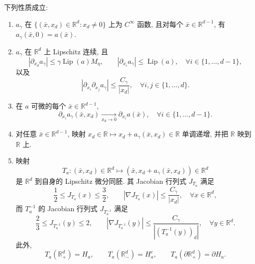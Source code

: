 \begin{Proposition}
\label{prop:chap3-regularized-graph-properties}
下列性质成立:
\begin{enumerate}
 \item $a_\gamma$ 在 $\{(\bar x,x_d)\in\mathbb R^d:x_d\neq0\}$ 上为 $C^\infty$ 函数, 且对每个 $\bar x\in\mathbb R^{d-1}$, 有 $a_\gamma(\bar x,0)=a(\bar x)$.
 \item $a_\gamma$ 在 $\mathbb R^d$ 上 Lipschitz 连续, 且
 \[
  |\partial_{x_d}a_\gamma|\leq\gamma\operatorname{Lip}(a)M_\eta,
  \qquad |\partial_{x_i}a_\gamma|\leq\operatorname{Lip}(a),
  \quad\forall i\in\{1,\ldots,d-1\},
 \]
 以及
 \[
  |\partial_{x_i}\partial_{x_j}a_\gamma|
  \leq\frac{C_\gamma}{|x_d|},
  \quad\forall i,j\in\{1,\ldots,d\}.
 \]
 \item 在 $a$ 可微的每个 $\bar x\in\mathbb R^{d-1}$,
 \[
  \partial_{x_i}a_\gamma(\bar x,x_d)
  \underset{x_d\to0}{\longrightarrow}\partial_{x_i}a(\bar x),
  \quad\forall i\in\{1,\ldots,d-1\}.
 \]
 \item 对任意 $\bar x\in\mathbb R^{d-1}$, 映射 $x_d\in\mathbb R\mapsto x_d+a_\gamma(\bar x,x_d)\in\mathbb R$ 单调递增, 并把 $\mathbb R$ 映到 $\mathbb R$ 上.
 \item 映射
 \[
  T_a:(\bar x,x_d)\in\mathbb R^d
  \longmapsto(\bar x,x_d+a_\gamma(\bar x,x_d))\in\mathbb R^d
 \]
 是 $\mathbb R^d$ 到自身的 Lipschitz 微分同胚. 其 Jacobian 行列式 $J_{T_a}$ 满足
 \[
  \frac12\leq J_{T_a}(x)\leq\frac32,
  \qquad |\nabla J_{T_a}(x)|\leq\frac{C_\gamma}{|x_d|},
  \quad\forall x\in\mathbb R^d,
 \]
 而 $T_a^{-1}$ 的 Jacobian 行列式 $J_{T_a^{-1}}$ 满足
 \[
  \frac23\leq J_{T_a^{-1}}(y)\leq2,
  \qquad |\nabla J_{T_a^{-1}}(y)|
  \leq\frac{C_\gamma}{|(T_a^{-1}(y))_d|},
  \quad\forall y\in\mathbb R^d.
 \]
 此外,
 \[
  T_a(\mathbb R_+^d)=H_a,\qquad
  T_a(\mathbb R_-^d)=H_a^c,\qquad
  T_a(\partial\mathbb R_+^d)=\partial H_a.
 \]
\end{enumerate}
\end{Proposition}

